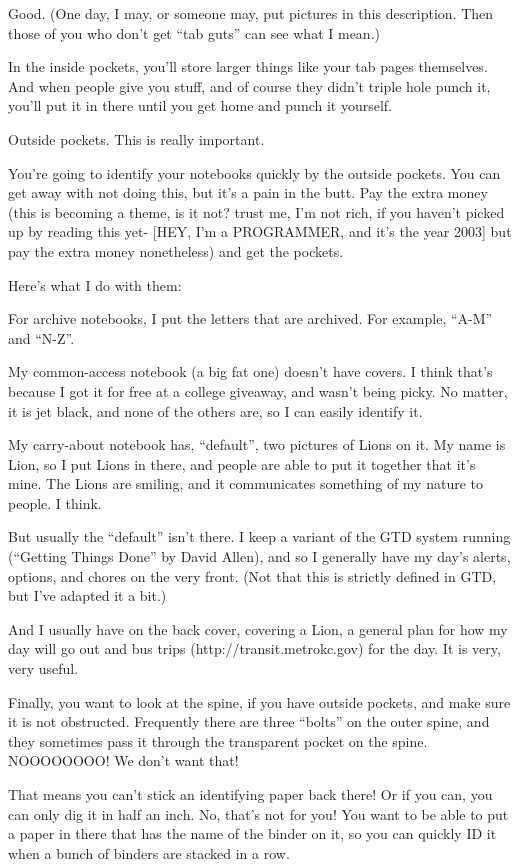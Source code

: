 \documentclass[oneside]{book}
\begin{document}
Good. (One day, I may, or someone may, put pictures in this
description. Then those of you who don't get ``tab guts'' can see what I
mean.)

In the inside pockets, you'll store larger things like your tab pages
themselves. And when people give you stuff, and of course they didn't
triple hole punch it, you'll put it in there until you get home and
punch it yourself.

Outside pockets. This is really important.

You're going to identify your notebooks quickly by the outside
pockets. You can get away with not doing this, but it's a pain in the
butt. Pay the extra money (this is becoming a theme, is it not? trust
me, I'm not rich, if you haven't picked up by reading this yet- [HEY,
I'm a PROGRAMMER, and it's the year 2003] but pay the extra money
nonetheless) and get the pockets.

Here's what I do with them:

For archive notebooks, I put the letters that are archived. For
example, ``A-M'' and ``N-Z''.

My common-access notebook (a big fat one) doesn't have covers. I think
that's because I got it for free at a college giveaway, and wasn't
being picky. No matter, it is jet black, and none of the others are,
so I can easily identify it.

My carry-about notebook has, ``default'', two pictures of Lions on
it. My name is Lion, so I put Lions in there, and people are able to
put it together that it's mine. The Lions are smiling, and it
communicates something of my nature to people. I think.

But usually the ``default'' isn't there. I keep a variant of the GTD
system running (``Getting Things Done'' by David Allen), and so I
generally have my day's alerts, options, and chores on the very
front. (Not that this is strictly defined in GTD, but I've adapted it
a bit.)

And I usually have on the back cover, covering a Lion, a general plan
for how my day will go out and bus trips (http://transit.metrokc.gov)
for the day. It is very, very useful.

Finally, you want to look at the spine, if you have outside pockets,
and make sure it is not obstructed. Frequently there are three ``bolts''
on the outer spine, and they sometimes pass it through the transparent
pocket on the spine. NOOOOOOOO! We don't want that!

That means you can't stick an identifying paper back there! Or if you
can, you can only dig it in half an inch. No, that's not for you! You
want to be able to put a paper in there that has the name of the
binder on it, so you can quickly ID it when a bunch of binders are
stacked in a row.
\end{document}
